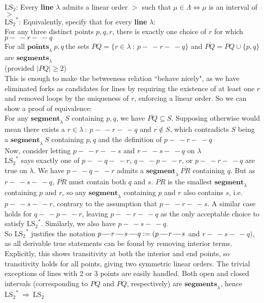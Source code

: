 \documentclass{article}
\newcommand{\hcm}[1][1]{\hspace{#1 cm}}
\newcommand{\nl}[1][12]{\\[#1pt]}
\newcommand{\imp}{\ \Rightarrow\ }
\newcommand{\st}{\ : \ }
\newcommand{\defeq}{\vcentcolon=}
\newcommand{\ch}[1]{\text{#1}}
\newcommand {\chb}[1]{\textbf{#1}}
\newcommand{\seg}{\!-\!\!\!\!\:-}
\begin{document}
\begin{flushleft}
$\ch{LS}_2$: Every \chb{line} $\lambda$ admits a linear order $>$ such that $\mu \in \Lambda \iff \mu$ is an interval of $>$\nl[5]

{\color{purple}
	${\ch{LS}_2}^*$: Equivalently, specify that for every \chb{line} $\lambda$:\\
	
	\hcm[2]For any three distinct points $p,q,r$, there is exactly one choice of $r$ for which $p\seg r \seg q$\\
	
	\hcm[2]For all $\chb{points}_\lambda\ p,q\ $the sets $PQ = \{r \in \lambda \st p\seg r \seg q\}$ and $\overline{PQ} = PQ\cup \{p,q\}$ are $\chb{segments}_\lambda$\\\hcm[2](provided $|PQ|\geq2$)\nl[5]
	
	\hcm This is enough to make the betweeness relation ``behave nicely", as we have eliminated  forks as candidates for lines by requiring the existence of at least one $r$ and removed loops by the uniqueness of $r$, enforcing a linear order. So we can show a proof of equivalence:\nl[5]
	
	\hcm For any $\chb{segment}_\lambda\ S$ containing $p, q$, we have $\overline{PQ} \subseteq S$. Supposing otherwise would mean there exists a $r \in \lambda \st p\seg r \seg q$ and $r \notin S$, which contradicts $S$ being a $\chb{segment}_\lambda\ S$ containing $p, q$ and the definition of $p\seg r \seg q$\nl[5]
	 
	\hcm Now, consider letting $p \seg r \seg s$ and $r\seg s\seg q$ on $\lambda$\nl[5]
	\hcm${\ch{LS}_2}^*$ says exactly one of $p\seg q \seg r$, $q \seg p \seg r$, or $p \seg r \seg q$ are true on $\lambda$. We have $p \seg q \seg r$ admits a $\chb{segment}_\lambda\ \overline{PR}$ containing $q$. But as $r\seg s \seg q$, $\overline{PR}$ must contain both $q$ and $s$. $\overline{PR}$ is the smallest $\chb{segment}_\lambda$ containing $p$ and $r$, so any $\chb{segment}_\lambda$ containing $p$ and $r$ also contains $s$, i.e. $p\seg s \seg r$, contrary to the assumption that $p \seg r \seg s$. A similar case holds for $q \seg p \seg r$, leaving $p \seg r \seg q$ as the only acceptable choice to satisfy ${\ch{LS}_2}^*$. Similarly, we also have $p \seg s \seg q$.\nl[5]
	
	\hcm So ${\ch{LS}_2}^*$ justifies the notation $p \seg r \seg s \seg q \defeq (p \seg r \seg s$ and $r \seg s \seg q)$, as all derivable true statements can be found by removing interior terms. Explicitly, this shows transitivity at both the interior and end points, so transitivity holds for all points, giving two symmetric linear orders. The trivial exceptions of lines with 2 or 3 points are easily handled. Both open and closed intervals (corresponding to $PQ$ and $\overline{PQ}$, respectively) are $\chb{segments}_\lambda$, hence ${\ch{LS}_2}^* \imp \ch{LS}_2$\nl[5]
}
	

\end{flushleft}
\end{document}
